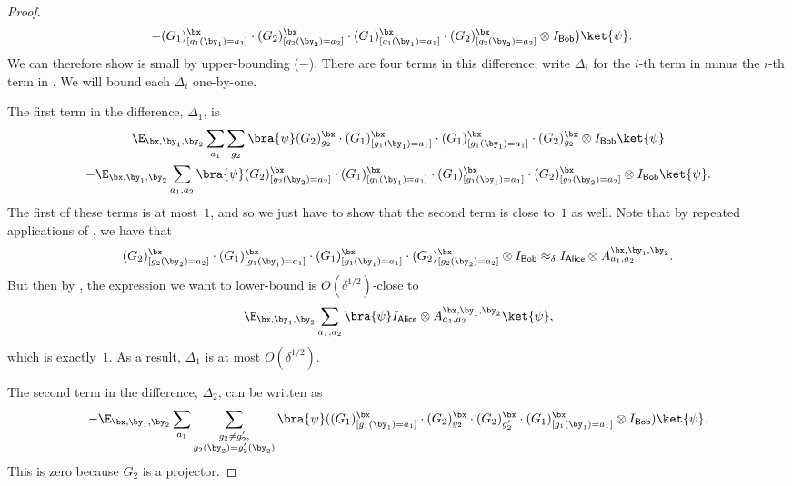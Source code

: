\documentclass[11pt]{article}
\newcommand{\reg}[1]{{\mathsf{#1}}}
\begin{document}
\begin{proof}
\begin{align}
	- &(G_1)^{\bx}_{[g_1(\by_1) = a_1]} \cdot (G_2)^\bx_{[g_2(\by_2) = a_2]} \cdot (G_1)^{\bx}_{[g_1(\by_1) = a_1]} \cdot (G_2)^\bx_{[g_2(\by_2) = a_2]}\otimes I_{\reg{Bob}} \big)\ket{\psi}.\label{eq:what-to-do-with-this}
\end{align}
We can therefore show  is small by
upper-bounding ($ - $).
There are four terms in this difference;
write $\Delta_i$ for the $i$-th term in  minus the $i$-th term in .
We will bound each $\Delta_i$ one-by-one.

The first term in the difference, $\Delta_1$, is
\begin{multline*}
\E_{\bx, \by_1, \by_2} \sum_{a_1}\sum_{g_2} \bra{\psi}
	(G_2)^{\bx}_{g_2}
	\cdot (G_1)^{\bx}_{[g_1(\by_1) = a_1]} \cdot (G_1)^{\bx}_{[g_1(\by_1) = a_1]} \cdot (G_2)^{\bx}_{g_2} \otimes I_{\reg{Bob}} \ket{\psi}\\
-\E_{\bx, \by_1, \by_2} \sum_{a_1, a_2} \bra{\psi}
	(G_2)^{\bx}_{[g_2(\by_2) = a_2]}
	\cdot (G_1)^{\bx}_{[g_1(\by_1) = a_1]} \cdot (G_1)^{\bx}_{[g_1(\by_1) = a_1]} \cdot (G_2)^{\bx}_{[g_2(\by_2) = a_2]} \otimes I_{\reg{Bob}} \ket{\psi}.
\end{multline*}
The first of these terms is at most~$1$, and so we just have to show that the second term is close to~$1$ as well.
Note that by repeated applications of , we have that 
\begin{equation*}
(G_2)^{\bx}_{[g_2(\by_2) = a_2]}
	\cdot (G_1)^{\bx}_{[g_1(\by_1) = a_1]} \cdot (G_1)^{\bx}_{[g_1(\by_1) = a_1]} \cdot (G_2)^{\bx}_{[g_2(\by_2) = a_2]} \otimes I_{\reg{Bob}}
	\approx_{\delta} I_{\reg{Alice}} \otimes A^{\bx, \by_1, \by_2}_{a_1, a_2}.
\end{equation*}
But then by , the expression we want to lower-bound is $O(\delta^{1/2})$-close to
\begin{equation*}
\E_{\bx, \by_1, \by_2} \sum_{a_1, a_2} \bra{\psi} I_{\reg{Alice}} \otimes A^{\bx, \by_1, \by_2}_{a_1, a_2} \ket{\psi},
\end{equation*}
which is exactly~$1$. As a result, $\Delta_1$ is at most $O(\delta^{1/2})$.

The second term in the difference, $\Delta_2$, can be written as
\begin{equation*}
-\E_{\bx, \by_1, \by_2} \sum_{a_1}\sum_{\substack{g_2\neq g_2',\\g_2(\by_2) = g_2'(\by_2)}} \bra{\psi}(
	(G_1)^{\bx}_{[g_1(\by_1) = a_1]} \cdot (G_2)^{\bx}_{g_2} \cdot (G_2)^{\bx}_{g_2'} \cdot (G_1)^{\bx}_{[g_1(\by_1) = a_1]} \otimes I_{\reg{Bob}})\ket{\psi}.
\end{equation*}
This is zero because $G_2$ is a projector.


\end{proof}
\end{document}

